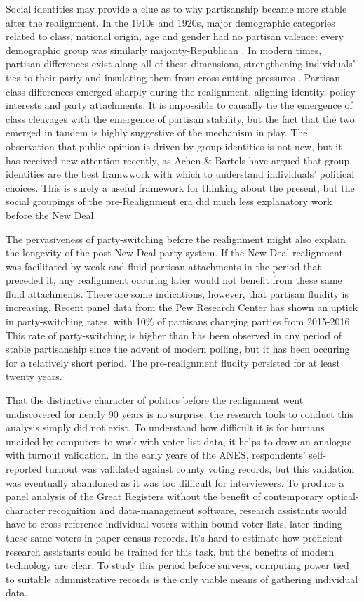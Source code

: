 \documentclass[11pt]{scrartcl}\usepackage[]{graphicx}\usepackage[]{color}
\begin{document}
 Social identities may provide a clue as to why partisanship became more stable after the realignment. In the 1910s and 1920s, major demographic categories related to class, national origin, age and gender had no partisan valence: every demographic group was similarly majority-Republican \citep{spahn2018before}. In modern times, partisan differences exist along all of these dimensions, strengthening individuals' ties to their party and insulating them from cross-cutting pressures \citep{mason2016cross}. Partisan class differences emerged sharply during the realignment, aligning identity, policy interests and party attachments. It is impossible to causally tie the emergence of class cleavages with the emergence of partisan stability, but the fact that the two emerged in tandem is highly suggestive of the mechanism in play.
% 
% 
 The observation that public opinion is driven by group identities is not new, but it has received new attention recently, as Achen \& Bartels \citeyearpar{achen2016democracy} have argued that group identities are the best framwwork with which to understand individuals' political choices.  This is surely a useful framework for thinking about the present, but the social groupings of the pre-Realignment era did much less explanatory work before the New Deal.
% 

The pervasiveness of party-switching before the realignment might also explain the longevity of the post-New Deal party system. If the New Deal realignment was facilitated by weak and fluid partisan attachments in the period that preceded it, any realignment occuring later would not benefit from these same fluid attachments.  There are some indications, however, that partisan fluidity is increasing.  Recent panel data from the Pew Research Center \citeyearpar{doherty2017partisan} has shown an uptick in party-switching rates, with 10\% of partisans changing parties from 2015-2016. This rate of party-switching is higher than has been observed in any period of stable partisanship since the advent of modern polling, but it has been occuring for a relatively short period. The pre-realignment fludity persisted for at least twenty years.

That the distinctive character of politics before the realignment went undiscovered for nearly 90 years is no surprise; the research tools to conduct this analysis simply did not exist. To understand how difficult it is for humans unaided by computers to work with voter list data, it helps to draw an analogue with turnout validation. In the early years of the ANES, respondents' self-reported turnout was validated against county voting records, but this validation was eventually abandoned as it was too difficult for interviewers. To produce a panel analysis of the Great Registers without the benefit of contemporary optical-character recognition and data-management software, research assistants would have to cross-reference individual voters within bound voter lists, later finding these same voters in paper census records. It's hard to estimate how proficient research assistants could be trained for this task, but the benefits of modern technology are clear.  To study this period before surveys, computing power tied to suitable administrative records is the only viable means of gathering individual data.
\end{document}
